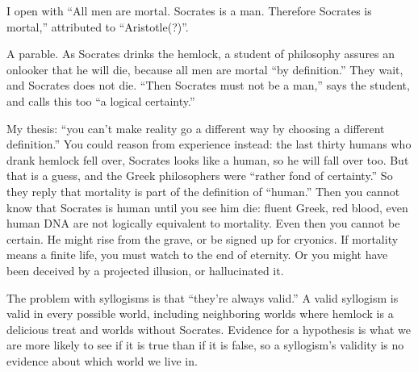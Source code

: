 
I open with ``All men are mortal. Socrates is a man. Therefore Socrates is mortal,'' attributed to ``Aristotle(?)''. 

A parable. As Socrates drinks the hemlock, a student of philosophy assures an onlooker that he will die, because all men are mortal ``by definition.'' They wait, and Socrates does not die. ``Then Socrates must not be a man,'' says the student, and calls this too ``a logical certainty.''

My thesis: ``you can't make reality go a different way by choosing a different definition.'' You could reason from experience instead: the last thirty humans who drank hemlock fell over, Socrates looks like a human, so he will fall over too. But that is a guess, and the Greek philosophers were ``rather fond of certainty.'' So they reply that mortality is part of the definition of ``human.''  Then you cannot know that Socrates is human until you see him die: fluent Greek, red blood, even human DNA are not logically equivalent to mortality. Even then you cannot be certain. He might rise from the grave, or be signed up for cryonics. If mortality means a finite life, you must watch to the end of eternity. Or you might have been deceived by a projected illusion, or hallucinated it. 

The problem with syllogisms is that ``they're always valid.'' A valid syllogism is valid in every possible world, including neighboring worlds where hemlock is a delicious treat and worlds without Socrates. Evidence for a hypothesis is what we are more likely to see if it is true than if it is false, so a syllogism's validity is no evidence about which world we live in.

